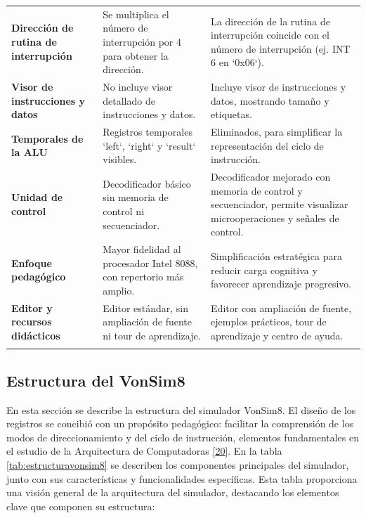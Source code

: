 \documentclass[12pt,oneside]{templates/unerthesis}
\begin{document}
\begin{table}[!h]
{\begin{tabular}[t]{>{\raggedright\arraybackslash}p{5cm}|>{\raggedright\arraybackslash}p{7cm}>{\raggedright\arraybackslash}p{8cm}}
\addlinespace[10pt]
\textbf{Dirección de rutina de interrupción} & Se multiplica el número de interrupción por 4 para obtener la dirección. & La dirección de la rutina de interrupción coincide con el número de interrupción (ej. INT 6 en `0x06`).\\
\addlinespace[10pt]
\textbf{Visor de instrucciones y datos} & No incluye visor detallado de instrucciones y datos. & Incluye visor de instrucciones y datos, mostrando tamaño y etiquetas.\\
\addlinespace[10pt]
\textbf{Temporales de la ALU} & Registros temporales `left`, `right` y `result` visibles. & Eliminados, para simplificar la representación del ciclo de instrucción.\\
\addlinespace[10pt]
\addlinespace
\textbf{Unidad de control} & Decodificador básico sin memoria de control ni secuenciador. & Decodificador mejorado con memoria de control y secuenciador, permite visualizar microoperaciones y señales de control.\\
\addlinespace[10pt]
\textbf{Enfoque pedagógico} & Mayor fidelidad al procesador Intel 8088, con repertorio más amplio. & Simplificación estratégica para reducir carga cognitiva y favorecer aprendizaje progresivo.\\
\addlinespace[10pt]
\textbf{Editor y recursos didácticos} & Editor estándar, sin ampliación de fuente ni tour de aprendizaje. & Editor con ampliación de fuente, ejemplos prácticos, tour de aprendizaje y centro de ayuda.\\
\addlinespace[10pt]
\bottomrule
\end{tabular}}
\end{table}

\hypertarget{estructura-del-vonsim8}{%
\subsection{Estructura del VonSim8}\label{estructura-del-vonsim8}}

En esta sección se describe la estructura del simulador VonSim8. El diseño de los registros se concibió con un propósito pedagógico: facilitar la comprensión de los modos de direccionamiento y del ciclo de instrucción, elementos fundamentales en el estudio de la Arquitectura de Computadoras \protect\hyperlink{ref-stallings_computer_2021}{{[}20{]}}. En la tabla \ref{tab:estructuravonsim8} se describen los componentes principales del simulador, junto con sus características y funcionalidades específicas. Esta tabla proporciona una visión general de la arquitectura del simulador, destacando los elementos clave que componen su estructura:
\end{document}
